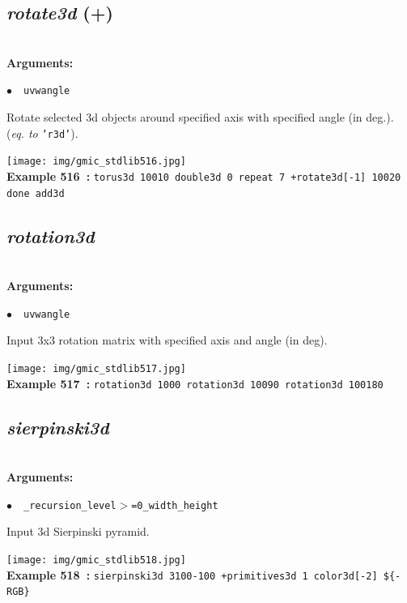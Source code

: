 \documentclass[a4paper,10.5pt,twoside]{book}
\def\comma{\discretionary{,}{}{,}}
\newcommand{\Cb}[1]{\textcolor{cb}{#1}}
\begin{document}
\subsection{\emph{rotate3d} (+)}\vspace*{-0.7em}
~\\\textbf{\Cb{Arguments: }}\begin{flushleft}
{\small \Cb{\hspace*{0.5cm}$\bullet$~~\texttt{u{\comma}v{\comma}w{\comma}angle}}}\end{flushleft}
Rotate selected 3d objects around specified axis with specified angle (in deg.).
~\\(\emph{eq. to} {\small \texttt{'r3d'}}).
\begin{center}\texttt{[image: img/gmic\_stdlib516.jpg]}\\
{\footnotesize \textbf{Example 516~:} \texttt{torus3d 100{\comma}10 double3d 0 repeat 7 +rotate3d[-1] 1{\comma}0{\comma}0{\comma}20 done add3d}}
\end{center}

\subsection{\emph{rotation3d} }\vspace*{-0.7em}
~\\\textbf{\Cb{Arguments: }}\begin{flushleft}
{\small \Cb{\hspace*{0.5cm}$\bullet$~~\texttt{u{\comma}v{\comma}w{\comma}angle}}}\end{flushleft}
Input 3x3 rotation matrix with specified axis and angle (in deg).
\begin{center}\texttt{[image: img/gmic\_stdlib517.jpg]}\\
{\footnotesize \textbf{Example 517~:} \texttt{rotation3d 1{\comma}0{\comma}0{\comma}0 rotation3d 1{\comma}0{\comma}0{\comma}90 rotation3d 1{\comma}0{\comma}0{\comma}180}}
\end{center}

\subsection{\emph{sierpinski3d} }\vspace*{-0.7em}
~\\\textbf{\Cb{Arguments: }}\begin{flushleft}
{\small \Cb{\hspace*{0.5cm}$\bullet$~~\texttt{\_recursion\_level$>$=0{\comma}\_width{\comma}\_height}}}\end{flushleft}
Input 3d Sierpinski pyramid.
\begin{center}\texttt{[image: img/gmic\_stdlib518.jpg]}\\
{\footnotesize \textbf{Example 518~:} \texttt{sierpinski3d 3{\comma}100{\comma}-100 +primitives3d 1 color3d[-2] \$\{-RGB\}}}
\end{center}
\end{document}
